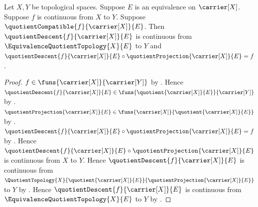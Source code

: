 \begin{theorem}\label{continuous_equivalence_quotient_descent}
    Let $X,Y$ be topological spaces.
    Suppose $E$ is an equivalence on $\carrier[X]$.
    Suppose $f$ is continuous from $X$ to $Y$.
    Suppose $\quotientCompatible{f}{\carrier[X]}{E}$.
    Then $\quotientDescent{f}{\carrier[X]}{E}$ is continuous from
        $\EquivalenceQuotientTopology{X}{E}$ to $Y$ and
        $\quotientDescent{f}{\carrier[X]}{E}\circ
            \quotientProjection{\carrier[X]}{E}=f$.
\end{theorem}
\begin{proof}
    $f\in\funs{\carrier[X]}{\carrier[Y]}$ by
        .
    Hence $\quotientDescent{f}{\carrier[X]}{E}\in
        \funs{\quotient{\carrier[X]}{E}}{\carrier[Y]}$ by
        .
    $\quotientProjection{\carrier[X]}{E}\in
        \funs{\carrier[X]}{\quotient{\carrier[X]}{E}}$ by
        .
    $\quotientDescent{f}{\carrier[X]}{E}\circ
        \quotientProjection{\carrier[X]}{E}=f$ by
        .
    Hence $\quotientDescent{f}{\carrier[X]}{E}\circ
        \quotientProjection{\carrier[X]}{E}$ is continuous from $X$
        to $Y$.
    Hence $\quotientDescent{f}{\carrier[X]}{E}$ is continuous from
        $\QuotientTopology{X}{\quotient{\carrier[X]}{E}}{
            \quotientProjection{\carrier[X]}{E}}$ to $Y$ by
        .
    Hence $\quotientDescent{f}{\carrier[X]}{E}$ is continuous from
        $\EquivalenceQuotientTopology{X}{E}$ to $Y$ by
        .
\end{proof}

